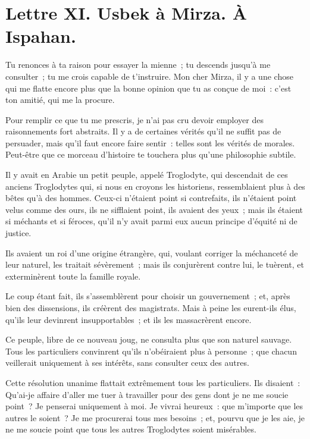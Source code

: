 \documentclass[french,twoside]{book} %
\newcommand{\dateline}[1]{\medskip{\RaggedLeft{#1}\par}\bigskip}
\begin{document}
\dateline{D’Ispahan, le dernier de la lune de Saphar, 1711}
\section[{Lettre XI. Usbek à Mirza. À Ispahan.}]{Lettre XI. Usbek à Mirza. À Ispahan.}\renewcommand{\leftmark}{Lettre XI. Usbek à Mirza. À Ispahan.}

\noindent Tu renonces à ta raison pour essayer la mienne ; tu descends jusqu’à me consulter ; tu me crois capable de t’instruire. Mon cher Mirza, il y a une chose qui me flatte encore plus que la bonne opinion que tu as conçue de moi : c’est ton amitié, qui me la procure.\par
Pour remplir ce que tu me prescris, je n’ai pas cru devoir employer des raisonnements fort abstraits. Il y a de certaines vérités qu’il ne suffit pas de persuader, mais qu’il faut encore faire sentir : telles sont les vérités de morales. Peut-être que ce morceau d’histoire te touchera plus qu’une philosophie subtile.\par
Il y avait en Arabie un petit peuple, appelé Troglodyte, qui descendait de ces anciens Troglodytes qui, si nous en croyons les historiens, ressemblaient plus à des bêtes qu’à des hommes. Ceux-ci n’étaient point si contrefaits, ils n’étaient point velus comme des ours, ils ne sifflaient point, ils avaient des yeux ; mais ils étaient si méchants et si féroces, qu’il n’y avait parmi eux aucun principe d’équité ni de justice.\par
Ils avaient un roi d’une origine étrangère, qui, voulant corriger la méchanceté de leur naturel, les traitait sévèrement ; mais ils conjurèrent contre lui, le tuèrent, et exterminèrent toute la famille royale.\par
Le coup étant fait, ils s’assemblèrent pour choisir un gouvernement ; et, après bien des dissensions, ils créèrent des magistrats. Mais à peine les eurent-ils élus, qu’ils leur devinrent insupportables ; et ils les massacrèrent encore.\par
Ce peuple, libre de ce nouveau joug, ne consulta plus que son naturel sauvage. Tous les particuliers convinrent qu’ils n’obéiraient plus à personne ; que chacun veillerait uniquement à ses intérêts, sans consulter ceux des autres.\par
Cette résolution unanime flattait extrêmement tous les particuliers. Ils disaient : Qu’ai-je affaire d’aller me tuer à travailler pour des gens dont je ne me soucie point ? Je penserai uniquement à moi. Je vivrai heureux : que m’importe que les autres le soient ? Je me procurerai tous mes besoins ; et, pourvu que je les aie, je ne me soucie point que tous les autres Troglodytes soient misérables.\par
\end{document}
